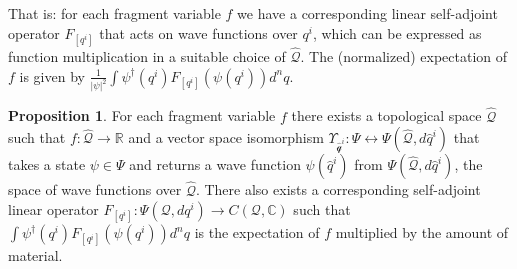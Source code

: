 \documentclass[smallextended]{svjour3}
\numberwithin{equation}{section}
\theoremstyle{definition}
\newtheorem{prop}[equation]{Proposition}
\begin{document}
That is: for each fragment variable $f$ we have a corresponding linear self-adjoint operator $F_{[q^i]}$ that acts on wave functions over $q^i$, which can be expressed as function multiplication in a suitable choice of $\hat{\mathcal{Q}}$. The (normalized) expectation of $f$ is given by $\frac{1}{|\psi|^2}\int \psi^\dagger(q^i) F_{[q^i]} (\psi(q^i)) d^nq$.

\begin{prop}\label{prop:self_adjoint_operators}
	For each fragment variable $f$ there exists a topological space $\hat{\mathcal{Q}}$ such that $f : \hat{\mathcal{Q}} \rightarrow \mathbb{R}$ and a vector space isomorphism $\Upsilon_{\hat{\mathcal{q}}^i} : \Psi \leftrightarrow \Psi(\hat{\mathcal{Q}}, d\hat{q}^i)$ that takes a state $\psi \in \Psi$ and returns a wave function $\psi(\hat{q}^i)$ from $\Psi(\hat{\mathcal{Q}}, d\hat{q}^i)$, the space of wave functions over $\hat{\mathcal{Q}}$. There also exists a corresponding self-adjoint linear operator $F_{[q^i]} : \Psi(\mathcal{Q}, dq^i) \rightarrow C(\mathcal{Q}, \mathbb{C})$ such that $\int \psi^\dagger(q^i) F_{[q^i]}( \psi(q^i))d^nq $ is the expectation of $f$ multiplied by the amount of material. 
\end{prop}
\end{document}
